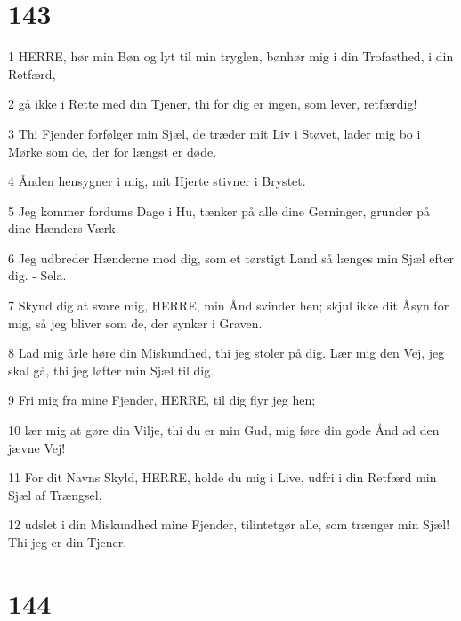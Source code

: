 \chapter{143}

\par 1 HERRE, hør min Bøn og lyt til min tryglen, bønhør mig i din Trofasthed, i din Retfærd,
\par 2 gå ikke i Rette med din Tjener, thi for dig er ingen, som lever, retfærdig!
\par 3 Thi Fjender forfølger min Sjæl, de træder mit Liv i Støvet, lader mig bo i Mørke som de, der for længst er døde.
\par 4 Ånden hensygner i mig, mit Hjerte stivner i Brystet.
\par 5 Jeg kommer fordums Dage i Hu, tænker på alle dine Gerninger, grunder på dine Hænders Værk.
\par 6 Jeg udbreder Hænderne mod dig, som et tørstigt Land så længes min Sjæl efter dig. - Sela.
\par 7 Skynd dig at svare mig, HERRE, min Ånd svinder hen; skjul ikke dit Åsyn for mig, så jeg bliver som de, der synker i Graven.
\par 8 Lad mig årle høre din Miskundhed, thi jeg stoler på dig. Lær mig den Vej, jeg skal gå, thi jeg løfter min Sjæl til dig.
\par 9 Fri mig fra mine Fjender, HERRE, til dig flyr jeg hen;
\par 10 lær mig at gøre din Vilje, thi du er min Gud, mig føre din gode Ånd ad den jævne Vej!
\par 11 For dit Navns Skyld, HERRE, holde du mig i Live, udfri i din Retfærd min Sjæl af Trængsel,
\par 12 udslet i din Miskundhed mine Fjender, tilintetgør alle, som trænger min Sjæl! Thi jeg er din Tjener.

\chapter{144}

